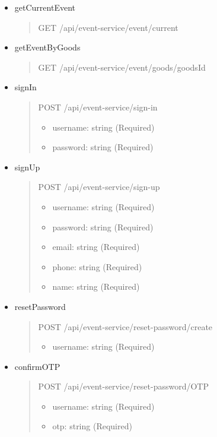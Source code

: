 \begin{itemize}
	\item getCurrentEvent
	      \begin{quote}
		      GET /api/event-service/event/current
	      \end{quote}

	\item getEventByGoods
	      \begin{quote}
		      GET /api/event-service/event/goods/{goodsId}
	      \end{quote}

\end{itemize}

\begin{itemize}
	\item signIn
	      \begin{quote}
		      POST /api/event-service/sign-in
		      \begin{itemize}
			      \item username: string (Required)
			      \item password: string (Required)
		      \end{itemize}
	      \end{quote}

	\item signUp
	      \begin{quote}
		      POST /api/event-service/sign-up
		      \begin{itemize}
			      \item username: string (Required)
			      \item password: string (Required)
			      \item email:	string (Required)
			      \item phone:	string (Required)
			      \item name:	string (Required)
		      \end{itemize}
	      \end{quote}
	\item resetPassword
	      \begin{quote}
		      POST /api/event-service/reset-password/create
		      \begin{itemize}
			      \item username: string (Required)
		      \end{itemize}
	      \end{quote}
	\item confirmOTP
	      \begin{quote}
		      POST /api/event-service/reset-password/OTP
		      \begin{itemize}
			      \item username: string (Required)
			      \item otp:	string (Required)
		      \end{itemize}
	      \end{quote}

\end{itemize}




